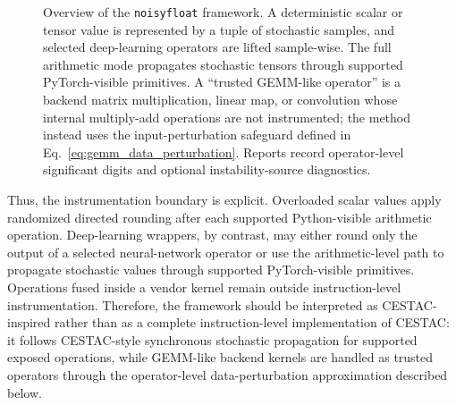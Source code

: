 \documentclass[manuscript, screen]{acmart}
\begin{document}
\begin{figure}[t]
{%
}
\caption{Overview of the \texttt{noisyfloat} framework. A deterministic scalar or tensor value is represented by a tuple of stochastic samples, and selected deep-learning operators are lifted sample-wise. The full arithmetic mode propagates stochastic tensors through supported PyTorch-visible primitives. A ``trusted GEMM-like operator'' is a backend matrix multiplication, linear map, or convolution whose internal multiply-add operations are not instrumented; the method instead uses the input-perturbation safeguard defined in Eq.~\eqref{eq:gemm_data_perturbation}. Reports record operator-level significant digits and optional instability-source diagnostics.}
\label{fig:nfloat-method-overview}
\end{figure}




Thus, the instrumentation boundary is explicit. Overloaded scalar values apply randomized directed rounding after each supported Python-visible arithmetic operation. Deep-learning wrappers, by contrast, may either round only the output of a selected neural-network operator or use the arithmetic-level path to propagate stochastic values through supported PyTorch-visible primitives. Operations fused inside a vendor kernel remain outside instruction-level instrumentation. Therefore, the framework should be interpreted as CESTAC-inspired rather than as a complete instruction-level implementation of CESTAC: it follows CESTAC-style synchronous stochastic propagation for supported exposed operations, while GEMM-like backend kernels are handled as trusted operators through the operator-level data-perturbation approximation described below.
\end{document}
